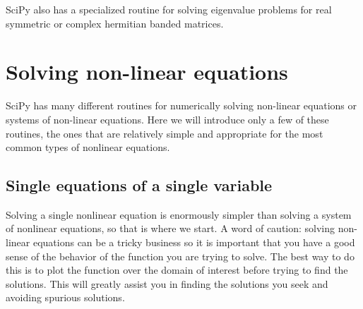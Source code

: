 \documentclass[letterpaper,10pt,english]{sphinxmanual}
\begin{document}
SciPy also has a specialized routine  for solving eigenvalue problems for real symmetric or complex hermitian banded matrices.


\section{Solving non-linear equations}
\label{chap9/chap9_scipy:solving-non-linear-equations}\label{chap9/chap9_scipy:sec-findingroots}\label{chap9/chap9_scipy:index-11}
SciPy has many different routines for numerically solving non-linear equations or systems of non-linear equations.  Here we will introduce only a few of these routines, the ones that are relatively simple and appropriate for the most common types of nonlinear equations.


\subsection{Single equations of a single variable}
\label{chap9/chap9_scipy:single-equations-of-a-single-variable}
Solving a single nonlinear equation is enormously simpler than solving a system of nonlinear equations, so that is where we start.  A word of caution: solving non-linear equations can be a tricky business so it is important that you have a good sense of the behavior of the function you are trying to solve.  The best way to do this is to plot the function over the domain of interest before trying to find the solutions.  This will greatly assist you in finding the solutions you seek and avoiding spurious solutions.
\end{document}
